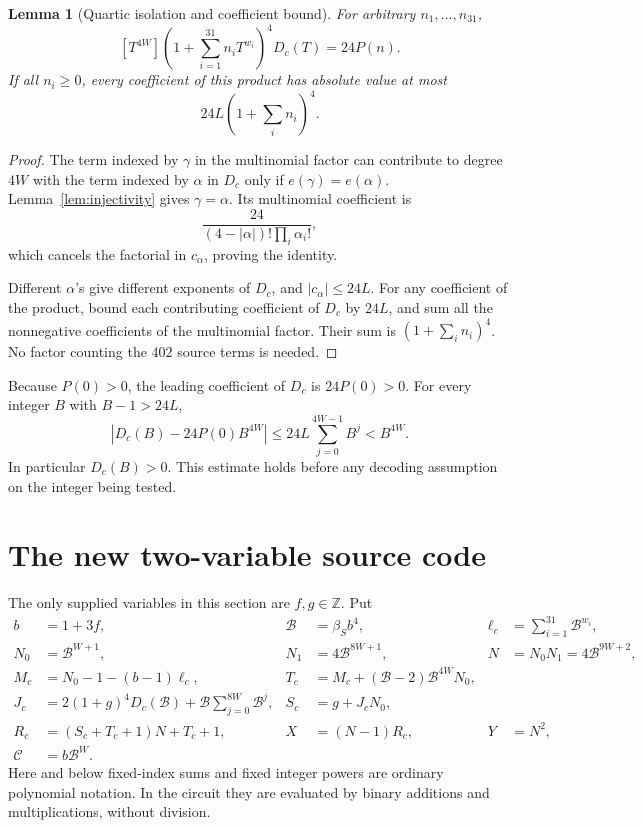 \documentclass[11pt,letterpaper]{article}
\newcommand{\Z}{\mathbb Z}
\newcommand{\B}{\mathcal B}
\newcommand{\capc}{\mathscr C}
\newtheorem{lemma}[theorem]{Lemma}
\theoremstyle{remark}
\begin{document}
\begin{lemma}[Quartic isolation and coefficient bound]
\label{lem:isolation}
For arbitrary \(n_1,\ldots,n_{31}\),
\[
[T^{4W}]\left(1+\sum_{i=1}^{31}n_iT^{w_i}\right)^4D_c(T)
  =24P(n).
\]
If all \(n_i\ge0\), every coefficient of this product has absolute
value at most
\[
24L\left(1+\sum_i n_i\right)^4.
\]
\end{lemma}
\begin{proof}
The term indexed by \(\gamma\) in the multinomial factor can contribute
to degree \(4W\) with the term indexed by \(\alpha\) in \(D_c\) only if
\(e(\gamma)=e(\alpha)\). Lemma~\ref{lem:injectivity} gives
\(\gamma=\alpha\). Its multinomial coefficient is
\[
\frac{24}{(4-|\alpha|)!\prod_i\alpha_i!},
\]
which cancels the factorial in \(c_\alpha\), proving the identity.

Different \(\alpha\)'s give different exponents of \(D_c\), and
\(|c_\alpha|\le24L\). For any coefficient of the product, bound each
contributing coefficient of \(D_c\) by \(24L\), and sum all the
nonnegative coefficients of the multinomial factor. Their sum is
\((1+\sum_i n_i)^4\). No factor counting the \(402\) source terms is needed.
\end{proof}

Because \(P(0)>0\), the leading coefficient of \(D_c\) is \(24P(0)>0\).
For every integer \(B\) with \(B-1>24L\),
\[
\left|D_c(B)-24P(0)B^{4W}\right|
 \le24L\sum_{j=0}^{4W-1}B^j<B^{4W}.
\]
In particular \(D_c(B)>0\). This estimate holds before any decoding
assumption on the integer being tested.

\section{The new two-variable source code}
\label{sec:coding}

The only supplied variables in this section are \(f,g\in\Z\). Put
\begin{align}
b&=1+3f,& \B&=\beta_Sb^4,&
\ell_c&=\sum_{i=1}^{31}\B^{w_i},\nonumber\\
N_0&=\B^{W+1},&
N_1&=4\B^{8W+1},&
N&=N_0N_1=4\B^{9W+2},\nonumber\\
M_c&=N_0-1-(b-1)\ell_c,&
T_c&=M_c+(\B-2)\B^{4W}N_0,\nonumber\\
J_c&=2(1+g)^4D_c(\B)+\B\sum_{j=0}^{8W}\B^j,&
S_c&=g+J_cN_0,\nonumber\\
R_c&=(S_c+T_c+1)N+T_c+1,&
X&=(N-1)R_c,&Y&=N^2,\nonumber\\
\capc&=b\B^W.
\label{eq:newsource}
\end{align}
Here and below fixed-index sums and fixed integer powers are ordinary
polynomial notation. In the circuit they are evaluated by binary
additions and multiplications, without division.
\end{document}

